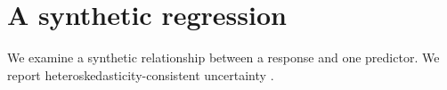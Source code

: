 \documentclass{article}
\begin{document}
\section*{A synthetic regression}
We examine a synthetic relationship between a response and one predictor.
We report heteroskedasticity-consistent uncertainty \cite{white-1980,mackinnon-white-1985}.







\end{document}
